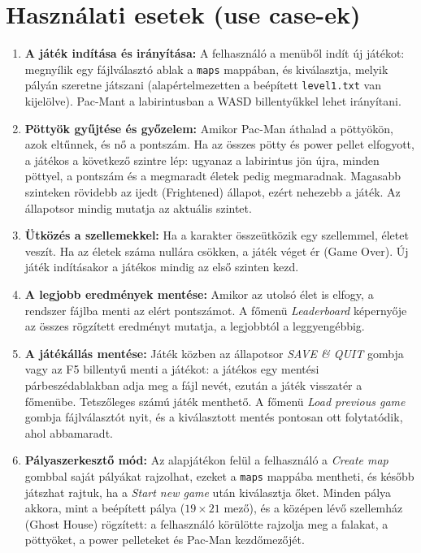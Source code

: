 \documentclass[11pt, a4paper]{article}
\begin{document}
\section{Használati esetek (use case-ek)}
\begin{enumerate}
    \item \textbf{A játék indítása és irányítása:} A felhasználó a menüből indít új játékot: megnyílik egy fájlválasztó ablak a \texttt{maps} mappában, és kiválasztja, melyik pályán szeretne játszani (alapértelmezetten a beépített \texttt{level1.txt} van kijelölve). Pac-Mant a labirintusban a WASD billentyűkkel lehet irányítani.
    \item \textbf{Pöttyök gyűjtése és győzelem:} Amikor Pac-Man áthalad a pöttyökön, azok eltűnnek, és nő a pontszám. Ha az összes pötty és power pellet elfogyott, a játékos a következő szintre lép: ugyanaz a labirintus jön újra, minden pöttyel, a pontszám és a megmaradt életek pedig megmaradnak. Magasabb szinteken rövidebb az ijedt (Frightened) állapot, ezért nehezebb a játék. Az állapotsor mindig mutatja az aktuális szintet.
    \item \textbf{Ütközés a szellemekkel:} Ha a karakter összeütközik egy szellemmel, életet veszít. Ha az életek száma nullára csökken, a játék véget ér (Game Over). Új játék indításakor a játékos mindig az első szinten kezd.
    \item \textbf{A legjobb eredmények mentése:} Amikor az utolsó élet is elfogy, a rendszer fájlba menti az elért pontszámot. A főmenü \textit{Leaderboard} képernyője az összes rögzített eredményt mutatja, a legjobbtól a leggyengébbig.
    \item \textbf{A játékállás mentése:} Játék közben az állapotsor \textit{SAVE \& QUIT} gombja vagy az F5 billentyű menti a játékot: a játékos egy mentési párbeszédablakban adja meg a fájl nevét, ezután a játék visszatér a főmenübe. Tetszőleges számú játék menthető. A főmenü \textit{Load previous game} gombja fájlválasztót nyit, és a kiválasztott mentés pontosan ott folytatódik, ahol abbamaradt.
    \item \textbf{Pályaszerkesztő mód:} Az alapjátékon felül a felhasználó a \textit{Create map} gombbal saját pályákat rajzolhat, ezeket a \texttt{maps} mappába mentheti, és később játszhat rajtuk, ha a \textit{Start new game} után kiválasztja őket. Minden pálya akkora, mint a beépített pálya ($19 \times 21$ mező), és a középen lévő szellemház (Ghost House) rögzített: a felhasználó körülötte rajzolja meg a falakat, a pöttyöket, a power pelleteket és Pac-Man kezdőmezőjét.
\end{enumerate}
\end{document}
